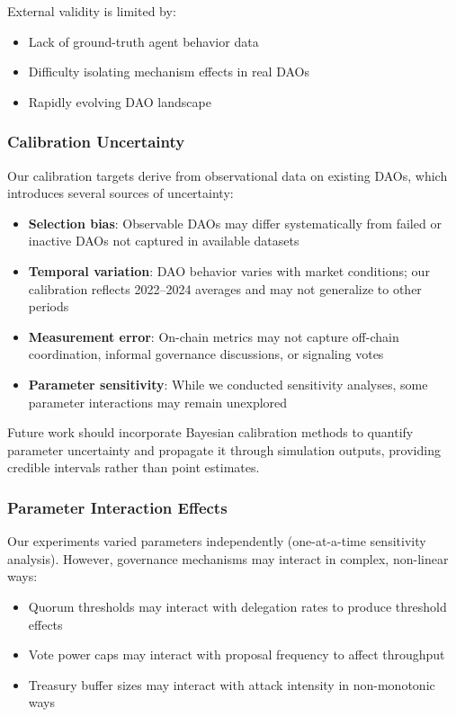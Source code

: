 External validity is limited by:

\begin{itemize}
    \item Lack of ground-truth agent behavior data
    \item Difficulty isolating mechanism effects in real DAOs
    \item Rapidly evolving DAO landscape
\end{itemize}

\subsubsection{Calibration Uncertainty}

Our calibration targets derive from observational data on existing DAOs, which introduces several sources of uncertainty:

\begin{itemize}
    \item \textbf{Selection bias}: Observable DAOs may differ systematically from failed or inactive DAOs not captured in available datasets
    \item \textbf{Temporal variation}: DAO behavior varies with market conditions; our calibration reflects 2022--2024 averages and may not generalize to other periods
    \item \textbf{Measurement error}: On-chain metrics may not capture off-chain coordination, informal governance discussions, or signaling votes
    \item \textbf{Parameter sensitivity}: While we conducted sensitivity analyses, some parameter interactions may remain unexplored
\end{itemize}

Future work should incorporate Bayesian calibration methods to quantify parameter uncertainty and propagate it through simulation outputs, providing credible intervals rather than point estimates.

\subsubsection{Parameter Interaction Effects}

Our experiments varied parameters independently (one-at-a-time sensitivity analysis). However, governance mechanisms may interact in complex, non-linear ways:

\begin{itemize}
    \item Quorum thresholds may interact with delegation rates to produce threshold effects
    \item Vote power caps may interact with proposal frequency to affect throughput
    \item Treasury buffer sizes may interact with attack intensity in non-monotonic ways
\end{itemize}

